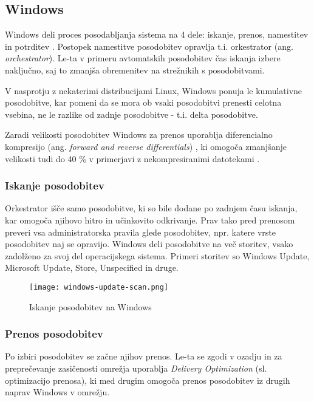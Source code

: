 \subsection{Windows}

Windows deli proces posodabljanja sistema na 4 dele: iskanje, prenos, namestitev in potrditev \cite{windows-update}.
Postopek namestitve posodobitev opravlja t.i. orkestrator (ang. \emph{orchestrator}).
Le-ta v primeru avtomatskih posodobitev čas iskanja izbere naključno, saj to zmanjša obremenitev na strežnikih s
posodobitvami.

V nasprotju z nekaterimi distribucijami Linux, Windows ponuja le kumulativne posodobitve, kar pomeni da se mora ob vsaki
posodobitvi prenesti celotna vsebina, ne le razlike od zadnje posodobitve - t.i. delta posodobitve.

Zaradi velikosti posodobitev Windows za prenos uporablja diferencialno kompresijo
(ang. \emph{forward and reverse differentials}) \cite{windows-update-compression}, ki omogoča zmanjšanje velikosti
tudi do 40 \% v primerjavi z nekompresiranimi datotekami \cite{windows-update-compression-2}.

\subsubsection{Iskanje posodobitev}

Orkestrator išče samo posodobitve, ki so bile dodane po zadnjem času iskanja, kar omogoča njihovo hitro
in učinkovito odkrivanje.
Prav tako pred prenosom preveri vsa administratorska pravila glede posodobitev, npr. katere vrste posodobitev
naj se opravijo.
Windows deli posodobitve na več storitev, vsako zadolženo za svoj del operacijskega sistema.
Primeri storitev so Windows Update, Microsoft Update, Store, Unspecified in druge.

\begin{figure}[H]
    \centering
    \texttt{[image: windows-update-scan.png]}
    \caption{Iskanje posodobitev na Windows \cite{windows-update}}
\end{figure}

\subsubsection{Prenos posodobitev}

Po izbiri posodobitev se začne njihov prenos. Le-ta se zgodi v ozadju in za preprečevanje zasičenosti omrežja
uporablja \emph{Delivery Optimization} (sl. optimizacijo prenosa), ki med drugim omogoča prenos posodobitev iz
drugih naprav Windows v omrežju.

